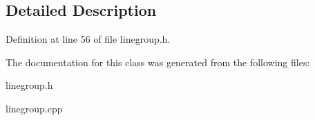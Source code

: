 \subsection{Detailed Description}


Definition at line 56 of file linegroup.h.



The documentation for this class was generated from the following files:\begin{DoxyCompactItemize}
\item 
linegroup.h\item 
linegroup.cpp\end{DoxyCompactItemize}
